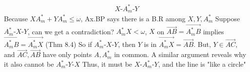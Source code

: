 \documentclass{report}
\begin{document}
\begin{itemize}
            \begin{align*}
                X\text{-}A_{m}^{*}\text{-}Y
            \end{align*}
            Because $XA_{m}^{*} + YA_{m}^{*} \leq \omega$, Ax.BP says there is a B.R among $X,Y,A_{m}^{*} $
            \bigbreak \noindent 
            Suppose $ A_{m}^{*}\text{-}X\text{-}Y$, can we get a contradiction?
            \bigbreak \noindent 
            $A_{m}^{*}X < \omega$, $X$ on $\overrightarrow{AB} = \overrightarrow{A_{m}^{*}B}$ implies $\overrightarrow{A_{m}^{*}B} = \overrightarrow{A_{m}^{*}X} $ (Thm 8.4)
            \bigbreak \noindent 
            So if $ A_{m}^{*}\text{-}X\text{-}Y$, then $Y$ is in $\overrightarrow{A_{m}^{*}X} = \overrightarrow{AB}$. But, $Y \in \overrightarrow{AC}$, and $\overrightarrow{AC}, \overrightarrow{AB}$ have only points $A,A_{m}^{*}$ in common. A similar argument reveals why it also cannot be  $A_{m}^{*}\text{-}Y\text{-}X$
            \bigbreak \noindent 
            Thus, it must be $ X\text{-}A_{m}^{*}\text{-}Y$, and the line is "like a circle"






    \end{itemize}

    \pagebreak 
\end{document}
